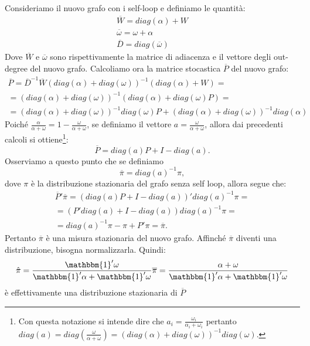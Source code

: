 \begin{alphaparts}
    Consideriamo il nuovo grafo con i self-loop e definiamo le quantità:
    \begin{gather*}
        \overline{W}= diag(\alpha)+ W\\
        \overline{\omega}= \omega+ \alpha\\
        \overline{D}= diag(\overline{\omega})
    \end{gather*}
    Dove \(\overline{W}\) e \(\overline{\omega}\) sono rispettivamente la matrice di adiacenza e il vettore degli out-degree del nuovo grafo. Calcoliamo ora la matrice stocastica \(\overline{P}\) del nuovo grafo:
    \begin{gather*}
        \overline{P}= \overline{D}^{-1}\overline{W}\left(diag(\alpha)+ diag(\omega)\right)^{-1}\left(diag(\alpha)+ W\right)=\\
        =\left(diag(\alpha)+ diag(\omega)\right)^{-1}\left(diag(\alpha)+ diag(\omega)P\right)=\\
        = \left(diag(\alpha)+ diag(\omega)\right)^{-1}diag(\omega)P + \left(diag(\alpha)+ diag(\omega)\right)^{-1}diag(\alpha)
    \end{gather*} 
    Poiché \(\frac{\alpha}{\alpha+ \omega}= 1- \frac{\omega}{\alpha+ \omega}\), se definiamo il vettore \(a= \frac{\omega}{\alpha+ \omega}\), allora dai precedenti calcoli si ottiene\footnote{Con questa notazione si intende dire che \(a_i = \frac{\omega_i}{\alpha_i + \omega_i}\) pertanto \(diag(a) = diag(\frac{\omega}{\alpha+ \omega}) = \left(diag(\alpha)+ diag(\omega)\right)^{-1}diag(\omega) \).}:
    \[\overline{P}= diag(a)P+ I- diag(a).\]
    Osserviamo a questo punto che se definiamo 
    \[\overline{\pi} = diag(a)^{-1}\pi,\]
    dove \(\pi\) è la distribuzione stazionaria del grafo senza self loop, allora segue che:
    \begin{gather*}
        \overline{P}'\overline{\pi}=\left(diag(a)P+ I- diag(a)\right)'diag(a)^{-1}\pi = \\
        = \left(P'diag(a)+ I- diag(a)\right)diag(a)^{-1}\pi= \\
        = diag(a)^{-1}\pi- \pi+ P'\pi = \overline{\pi}.
    \end{gather*}
    Pertanto \(\overline{\pi}\) è una misura stazionaria del nuovo grafo. Affinché \(\overline{\pi}\) diventi una distribuzione, bisogna normalizzarla. Quindi:
    \[\hat{\pi} = \frac{\mathbbm{1}'\omega}{\mathbbm{1}'\alpha+\mathbbm{1}'\omega}\overline{\pi} = \frac{\alpha+ \omega}{\mathbbm{1}'\alpha+\mathbbm{1}'\omega}\]
    è effettivamente una distribuzione stazionaria di \(\overline{P}\)
\end{alphaparts}
